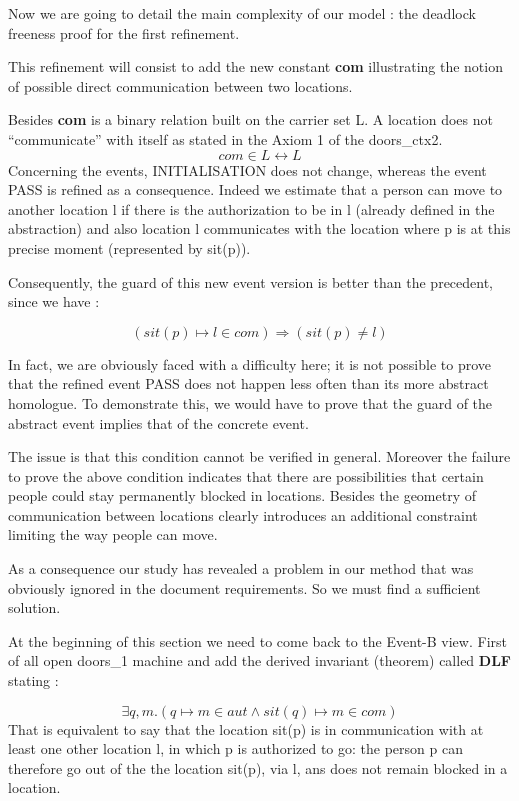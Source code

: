 Now we are going to detail the main complexity of our model : the deadlock freeness proof for the first refinement. 

This refinement will consist to add the new constant \textbf{com} illustrating the notion of possible direct communication between two locations.

Besides \textbf{com} is a binary relation built on the carrier set L. A location does not “communicate” with itself as stated in the Axiom 1 of the doors\_ctx2.
\[
com \in L\leftrightarrow L
\]
Concerning the events, \textsf{INITIALISATION} does not change, whereas the event \textsf{PASS} is refined as a consequence. Indeed we estimate that a person can move to another location l if there is the authorization to be in l (already defined in the abstraction) and also location l communicates with the location where p is at this precise moment (represented by sit(p)).

Consequently, the guard of this new event version is better than the precedent, since we have :

\[
( sit(p) \mapsto l \in com ) \Rightarrow ( sit(p)\neq l )
\]

In fact, we are obviously faced with a difficulty here; it is not possible to prove that the refined event \textsf{PASS} does not happen less often than its more abstract homologue. To demonstrate this, we would have to prove that the guard of the abstract event implies that of the concrete event.

The issue is that this condition cannot be verified in general. Moreover the failure to prove the above condition indicates that there are possibilities that certain people could stay permanently blocked in locations. Besides the geometry of communication between locations clearly introduces an additional constraint limiting the way people can move.

As a consequence our study has revealed a problem in our method that was obviously ignored in the document requirements.
So we must find a sufficient solution.

At the beginning of this section we need to come back to the \textsf{Event-B view}.
First of all open doors\_1 machine and add the derived invariant (theorem) called \textbf{DLF} stating :

\[
\exists q,m.(q \mapsto m \in aut \land sit(q) \mapsto m \in com )
\]
That is equivalent to say that the location sit(p) is in communication with at least one other location l, in which p is authorized to go:
the person p can therefore go out of the the location sit(p), via l, ans does not remain blocked in a location.

